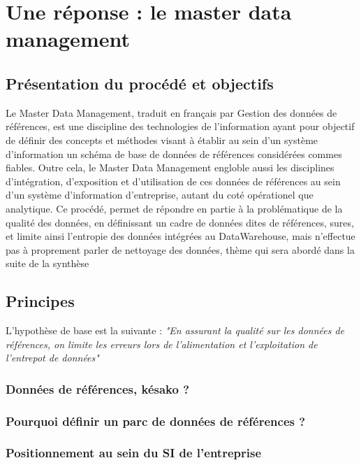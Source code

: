 \section{Une réponse : le master data management}

\subsection{Présentation du procédé et objectifs} 

Le Master Data Management, traduit en français par Gestion des données de références, est une discipline des technologies de l'information ayant pour objectif de définir des concepts et méthodes visant à établir au sein d'un système d'information un schéma de base de données de références considérées commes fiables.\n
Outre cela, le Master Data Management engloble aussi les disciplines d'intégration, d'exposition et d'utilisation de ces données de références au sein d'un système d'information d'entreprise, autant du coté opérationel que analytique.
Ce procédé, permet de répondre en partie à la problématique de la qualité des données, en définissant un cadre de données dites de références, sures, et limite ainsi l'entropie des données intégrées au DataWarehouse, mais n'effectue pas à proprement parler de nettoyage des données, thème qui sera abordé dans la suite de la synthèse

\subsection{Principes}

L'hypothèse de base est la suivante : \textit{"En assurant la qualité sur les données de références, on limite les erreurs lors de l'alimentation et l'exploitation de l'entrepot de données"}

\subsubsection{Données de références, késako ? }

\subsubsection{Pourquoi définir un parc de données de références ?}

\subsubsection{Positionnement au sein du SI de l'entreprise}

